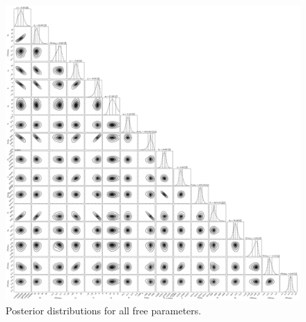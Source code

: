 \documentclass{emulateapj}
\begin{document}
\begin{figure}[!h]
\centering
\includegraphics[width=6.5in]{HD75732_2planet_corner.pdf}
\caption{Posterior distributions for all free parameters.}
\end{figure}

\end{document}

